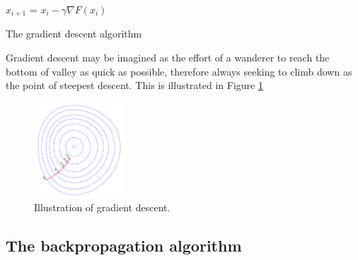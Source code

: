\documentclass[10pt,a4paper,DIV=11]{scrreprt}
\begin{document}
\begin{algorithm}[H]
\LinesNumbered
\DontPrintSemicolon
\BlankLine
{}
\BlankLine
\Begin
{
    {
        $x_{i+1}$ = $x_i - \gamma \nabla F(x_i)$
    }
}
\caption{The gradient descent algorithm}
\label{alg:GD}
\end{algorithm}

Gradient descent may be imagined as the effort of a wanderer to reach the bottom of valley as quick as possible, therefore always seeking to climb down as the point of steepest descent. This is illustrated in Figure \ref{fig:grad}

\begin{figure}[H]
    \centering
    \includegraphics[width=0.3\textwidth,scale=1]{files/graddes.png}  
    \caption{Illustration of gradient descent.\cite{GRADFIG}}
    \label{fig:grad}
\end{figure}

\subsection{The backpropagation algorithm}
\end{document}
